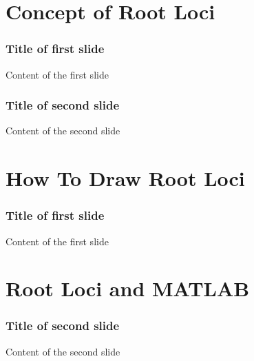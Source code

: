 \section{Concept of Root Loci}

\begin{frame}
\frametitle{Title of first slide}
Content of the first slide
\end{frame}

\begin{frame}
\frametitle{Title of second slide}
Content of the second slide
\end{frame}

\section{How To Draw Root Loci}

\begin{frame}
	\frametitle{Title of first slide}
	Content of the first slide
\end{frame}

\section{Root Loci and MATLAB}

\begin{frame}
	\frametitle{Title of second slide}
	Content of the second slide
\end{frame}